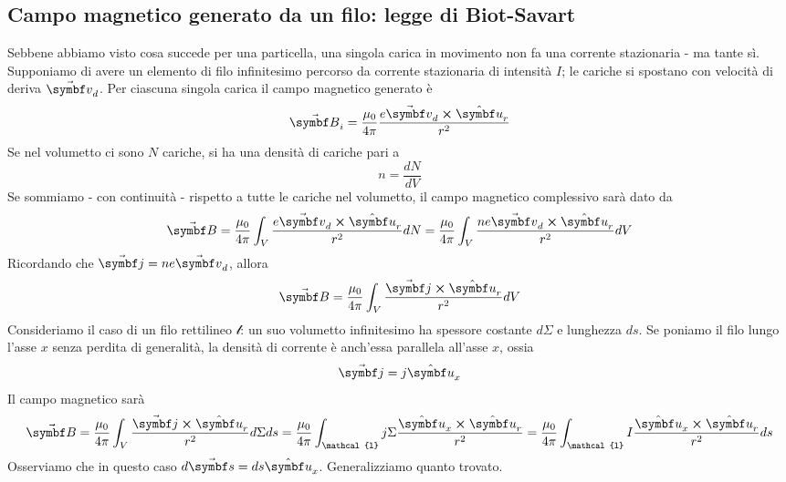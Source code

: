 \subsection{Campo magnetico generato da un filo: legge di Biot-Savart}
Sebbene abbiamo visto cosa succede per una particella, una singola carica in movimento non fa una corrente stazionaria - ma tante sì. Supponiamo di avere un elemento di filo infinitesimo percorso da corrente stazionaria di intensità $I$; le cariche si spostano con velocità di deriva $\vba{v}_d$. Per ciascuna singola carica il campo magnetico generato è
\begin{equation}
	\vba{B}_i=\frac{\mu_0}{4\pi}\frac{e\vba{v}_d\cross\vbh{u}_r}{r^2}
\end{equation}
Se nel volumetto ci sono $N$ cariche, si ha una densità di cariche pari a
\begin{equation*}
	n=\frac{dN}{dV}
\end{equation*}
Se sommiamo - con continuità - rispetto a tutte le cariche nel volumetto, il campo magnetico complessivo sarà dato da
\begin{equation*}
	\vba{B}=\frac{\mu_0}{4\pi}\int_V\frac{e\vba{v}_d\cross\vbh{u}_r}{r^2}dN=\frac{\mu_0}{4\pi}\int_V\frac{ne\vba{v}_d\cross\vbh{u}_r}{r^2}dV
\end{equation*}
Ricordando che $\vba{j}=ne\vba{v}_d$, allora
\begin{equation*}
	\vba{B}=\frac{\mu_0}{4\pi}\int_V\frac{\vba{j}\cross\vbh{u}_r}{r^2}dV
\end{equation*}
Consideriamo il caso di un filo rettilineo  $\mathcal{l}$: un suo volumetto infinitesimo ha spessore costante $d\Sigma$ e lunghezza $ds$. Se poniamo il filo lungo l'asse $x$ senza perdita di generalità, la densità di corrente è anch'essa parallela all'asse $x$, ossia
\begin{equation*}
	\vba{j}=j\vbh{u}_x
\end{equation*}
Il campo magnetico sarà
\begin{equation*}
	\vba{B}=\frac{\mu_0}{4\pi}\int_V\frac{\vba{j}\cross\vbh{u}_r}{r^2}d\Sigma ds=\frac{\mu_0}{4\pi}\int_{\mathcal{l}}j\Sigma\frac{\vbh{u}_x\cross\vbh{u}_r}{r^2}=\frac{\mu_0}{4\pi}\int_{\mathcal{l}}I\frac{\vbh{u}_x\cross\vbh{u}_r}{r^2}ds
\end{equation*}
Osserviamo che in questo caso $d\vba{s}=ds\vbh{u}_x$. Generalizziamo quanto trovato.

